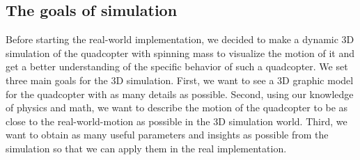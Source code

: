 \subsection{The goals of simulation}
Before starting the real-world implementation, we decided to make a dynamic 3D simulation of the quadcopter with spinning mass to visualize the motion of it and get a better understanding of the specific behavior of such a quadcopter.
\newline
\newline
We set three main goals for the 3D simulation. First, we want to see a 3D graphic model for the quadcopter with as many details as possible. Second, using our knowledge of physics and math, we want to describe the motion of the quadcopter to be as close to the real-world-motion as possible in the 3D simulation world. Third, we want to obtain as many useful parameters and insights as possible from the simulation so that we can apply them in the real implementation.
